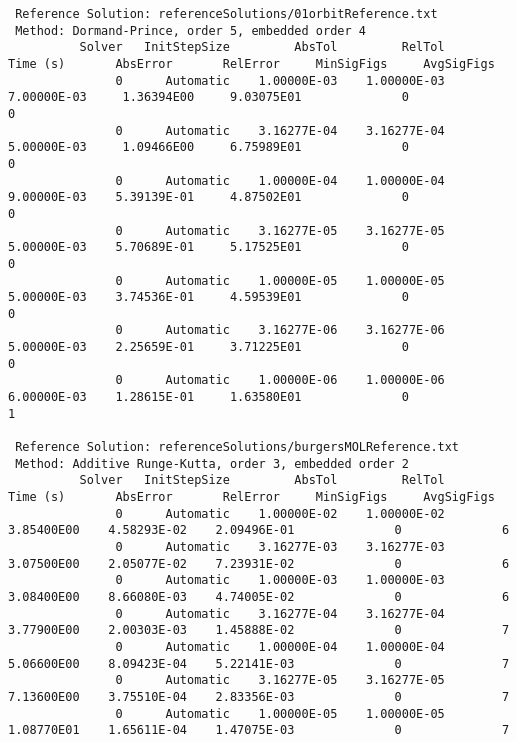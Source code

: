 \documentclass[10pt,letterpaper]{article}
\begin{document}
{\begin{verbatim}
 Reference Solution: referenceSolutions/01orbitReference.txt
 Method: Dormand-Prince, order 5, embedded order 4
          Solver   InitStepSize         AbsTol         RelTol       Time (s)       AbsError       RelError     MinSigFigs     AvgSigFigs
               0      Automatic    1.00000E-03    1.00000E-03    7.00000E-03     1.36394E00     9.03075E01              0              0
               0      Automatic    3.16277E-04    3.16277E-04    5.00000E-03     1.09466E00     6.75989E01              0              0
               0      Automatic    1.00000E-04    1.00000E-04    9.00000E-03    5.39139E-01     4.87502E01              0              0
               0      Automatic    3.16277E-05    3.16277E-05    5.00000E-03    5.70689E-01     5.17525E01              0              0
               0      Automatic    1.00000E-05    1.00000E-05    5.00000E-03    3.74536E-01     4.59539E01              0              0
               0      Automatic    3.16277E-06    3.16277E-06    5.00000E-03    2.25659E-01     3.71225E01              0              0
               0      Automatic    1.00000E-06    1.00000E-06    6.00000E-03    1.28615E-01     1.63580E01              0              1

 Reference Solution: referenceSolutions/burgersMOLReference.txt
 Method: Additive Runge-Kutta, order 3, embedded order 2
          Solver   InitStepSize         AbsTol         RelTol       Time (s)       AbsError       RelError     MinSigFigs     AvgSigFigs
               0      Automatic    1.00000E-02    1.00000E-02     3.85400E00    4.58293E-02    2.09496E-01              0              6
               0      Automatic    3.16277E-03    3.16277E-03     3.07500E00    2.05077E-02    7.23931E-02              0              6
               0      Automatic    1.00000E-03    1.00000E-03     3.08400E00    8.66080E-03    4.74005E-02              0              6
               0      Automatic    3.16277E-04    3.16277E-04     3.77900E00    2.00303E-03    1.45888E-02              0              7
               0      Automatic    1.00000E-04    1.00000E-04     5.06600E00    8.09423E-04    5.22141E-03              0              7
               0      Automatic    3.16277E-05    3.16277E-05     7.13600E00    3.75510E-04    2.83356E-03              0              7
               0      Automatic    1.00000E-05    1.00000E-05     1.08770E01    1.65611E-04    1.47075E-03              0              7


\end{verbatim}}
\end{document}
